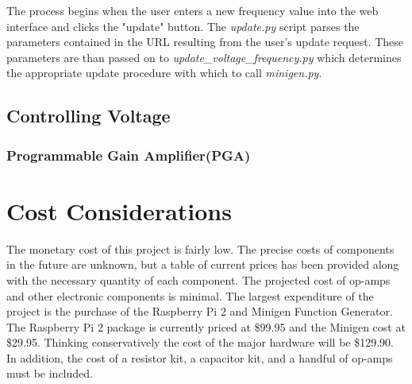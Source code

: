 \documentclass{article}	%
\begin{document}
\begin{multicols}{2}
The process begins when the user 
enters a new frequency value into the web interface
and clicks the "update" button.
The \textit{update.py} script parses 
the parameters contained in the URL
resulting from the user's update request.
These parameters are than
passed on to \textit{update\_voltage\_frequency.py}
which determines the appropriate update procedure 
with which to call \textit{minigen.py}.


\subsection{Controlling Voltage}

\subsubsection{Programmable Gain Amplifier(PGA)}


\section{Cost Considerations}
The monetary cost of this project is fairly low. 
The precise costs of components in the future are unknown, but
a table 
of current prices has been provided
along with the necessary quantity of each component.
The projected cost of op-amps and other electronic components is minimal. 
The largest expenditure of the project is
the purchase of the 
Raspberry Pi 2 and 
Minigen Function Generator. 
The Raspberry Pi 2 package is currently priced at \$99.95 and
the Minigen cost at \$29.95.
Thinking conservatively the cost of the major hardware will be \$129.90. 
In addition, the cost of 
a resistor kit, 
a capacitor kit, and 
a handful of op-amps 
must be included.


\begin{center}
    \begin{tabularx}{0.4\textwidth}{|X|X|X|X|}
        \hline


\end{tabularx}
\end{center}
\end{multicols}
\end{document}
